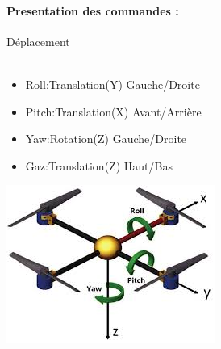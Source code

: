 \documentclass[12pt]{article}
\begin{document}
\paragraph*{Presentation des commandes :}
Déplacement\\~\\
\begin{minipage}{.5\linewidth}
\begin{itemize}
    \item Roll:Translation(Y) Gauche/Droite 
    \item Pitch:Translation(X) Avant/Arrière 
    \item Yaw:Rotation(Z) Gauche/Droite 
    \item Gaz:Translation(Z) Haut/Bas 
\end{itemize}
\end{minipage}
\hfill
\begin{minipage}{.5\linewidth}
\centering
\includegraphics[width=.5\linewidth]{index.jpeg}
\end{minipage}
\end{document}
